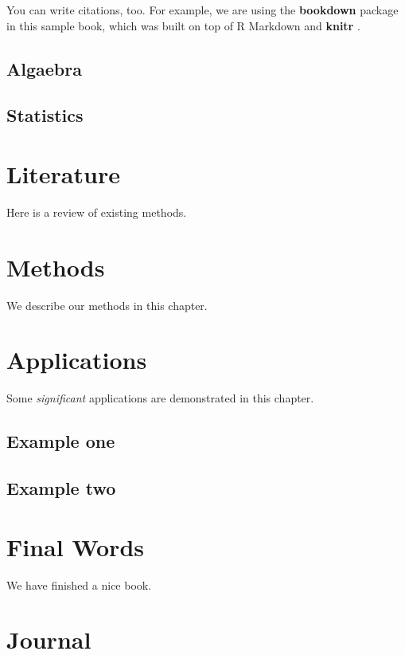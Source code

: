 \documentclass[]{book}
\theoremstyle{definition}
\theoremstyle{definition}
\theoremstyle{definition}
\theoremstyle{remark}
\begin{document}
You can write citations, too. For example, we are using the
\textbf{bookdown} package \citep{R-bookdown} in this sample book, which
was built on top of R Markdown and \textbf{knitr} \citep{aj2018}.

\section{Algaebra}\label{algaebra}

\section{Statistics}\label{statistics}

\chapter{Literature}\label{literature}

Here is a review of existing methods.

\chapter{Methods}\label{methods}

We describe our methods in this chapter.

\chapter{Applications}\label{applications}

Some \emph{significant} applications are demonstrated in this chapter.

\section{Example one}\label{example-one}

\section{Example two}\label{example-two}

\chapter{Final Words}\label{final-words}

We have finished a nice book.

\chapter{Journal}\label{journal}
\end{document}
